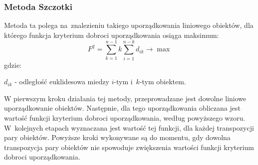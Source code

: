\documentclass[12pt,a4paper]{report}
\begin{document}
\subsubsection{Metoda Szczotki}


Metoda ta polega na~znalezieniu takiego uporządkowania liniowego obiektów, dla którego funkcja kryterium dobroci uporządkowania osiąga maksimum:
$$
F^{2}=\sum_{k=1}^{n-1} k\sum_{i=1}^{n-k} d_{ik} \rightarrow     \max  
$$
gdzie:

$d_{ik}$ - odległość euklidesowa miedzy $i$-tym i~$k$-tym obiektem.

W pierwszym kroku działania tej metody, przeprowadzane jest dowolne liniowe uporządkowanie obiektów. Następnie, dla tego uporządkowania obliczana jest wartość funkcji kryterium dobroci uporządkowania, według powyższego wzoru. W~kolejnych etapach wyznaczana jest wartość tej funkcji, dla każdej transpozycji pary obiektów. Powyższe kroki wykonywane są do momentu, gdy dowolna transpozycja pary obiektów nie spowoduje zwiększenia wartości funkcji kryterium dobroci uporządkowania. 
\end{document}
